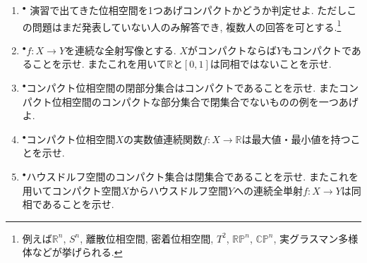\documentclass[dvipdfmx,a4paper,11pt]{article}
\newcommand{\R}{\mathbb{R}}
\newcommand{\C}{\mathbb{C}}
\theoremstyle{definition}
\begin{document}
\begin{enumerate}[label=\textbf{問}8.\arabic*]

\item $^{\bullet}$ 演習で出てきた位相空間を1つあげコンパクトかどうか判定せよ. ただしこの問題はまだ発表していない人のみ解答でき, 複数人の回答を可とする.\footnote{例えば$\R^n$, $S^{n}$, 離散位相空間, 密着位相空間, $T^2$, $\R\mathbb{P}^n$, $\C\mathbb{P}^n$, 実グラスマン多様体などが挙げられる. }


\item $^{\bullet}$$f : X \rightarrow Y$を連続な全射写像とする. $X$がコンパクトならば$Y$もコンパクトであることを示せ. またこれを用いて$\R$と$[0,1]$は同相ではないことを示せ.

\item $^{\bullet}$コンパクト位相空間の閉部分集合はコンパクトであることを示せ. またコンパクト位相空間のコンパクトな部分集合で閉集合でないものの例を一つあげよ.

\item $^{\bullet}$コンパクト位相空間$X$の実数値連続関数$f : X \rightarrow \R$は最大値・最小値を持つことを示せ.

\item $^{\bullet}$ハウスドルフ空間のコンパクト集合は閉集合であることを示せ. またこれを用いてコンパクト空間$X$からハウスドルフ空間$Y$への連続全単射$f : X \rightarrow Y$は同相であることを示せ.



	

\end{enumerate}
\end{document}
